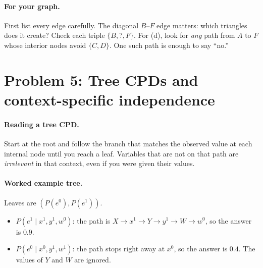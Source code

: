 \documentclass[11pt]{article}
\begin{document}
\paragraph{For your graph.} First list every edge carefully. The diagonal
$B$--$F$ edge matters: which triangles does it create? Check each triple
$\{B,?,F\}$. For (d), look for \emph{any} path from $A$ to $F$ whose
interior nodes avoid $\{C, D\}$. One such path is enough to say ``no.''

\section*{Problem 5: Tree CPDs and context-specific independence}

\paragraph{Reading a tree CPD.} Start at the root and follow the branch
that matches the observed value at each internal node until you reach a
leaf. Variables that are not on that path are \emph{irrelevant} in that
context, even if you were given their values.

\paragraph{Worked example tree.} Leaves are $(P(e^0), P(e^1))$.
\begin{center}
\end{center}
\begin{itemize}
  \item $P(e^1 \mid x^1, y^1, w^0)$: the path is $X\to x^1\to Y\to y^1\to W\to w^0$,
        so the answer is $0.9$.
  \item $P(e^0 \mid x^0, y^1, w^1)$: the path stops right away at
        $x^0$, so the answer is $0.4$. The values of $Y$ and $W$ are ignored.
\end{itemize}
\end{document}
